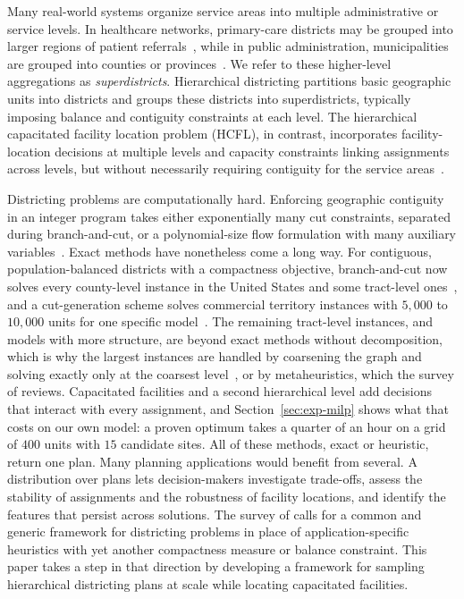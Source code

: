 \documentclass[preprint,12pt,authoryear]{elsarticle}
\theoremstyle{definition}
\begin{document}
Many real-world systems organize service areas into multiple administrative or service 
levels. In healthcare networks, primary-care districts may be grouped into larger 
regions of patient referrals~\citep{wang2025cluster}, while in public administration, 
municipalities are grouped into counties or provinces~\citep{bruno2017territorial}. 
We refer to these higher-level aggregations as \emph{superdistricts}. Hierarchical 
districting partitions basic geographic units into districts and groups these districts 
into superdistricts, typically imposing balance and contiguity constraints at each 
level. The hierarchical capacitated facility location problem (HCFL), in contrast, 
incorporates facility-location decisions at multiple levels and capacity constraints 
linking assignments across levels, but without necessarily requiring contiguity for the
service areas~\citep{contreras2020hierarchical}. 

Districting problems are computationally hard. Enforcing geographic contiguity in an integer program takes either exponentially many cut constraints, separated during branch-and-cut, or a polynomial-size flow formulation with many auxiliary variables~\citep{validi2022imposing}. Exact methods have nonetheless come a long way. For contiguous, population-balanced districts with a compactness objective, branch-and-cut now solves every county-level instance in the United States and some tract-level ones~\citep{validi2022cutedges, validi2022imposing}, and a cut-generation scheme solves commercial territory instances with $5{,}000$ to $10{,}000$ units for one specific model~\citep{rios2013commercial}. The remaining tract-level instances, and models with more structure, are beyond exact methods without decomposition, which is why the largest instances are handled by coarsening the graph and solving exactly only at the coarsest level~\citep{swamy2023multiobjective}, or by metaheuristics, which the survey of \citet{kalcsics2020districting} reviews. Capacitated facilities and a second hierarchical level add decisions that interact with every assignment, and Section~\ref{sec:exp-milp} shows what that costs on our own model: a proven optimum takes a quarter of an hour on a grid of $400$ units with $15$ candidate sites. All of these methods, exact or heuristic, return one plan. Many planning applications would benefit from several. A distribution over plans lets decision-makers investigate trade-offs, assess the stability of assignments and the robustness of facility locations, and identify the features that persist across solutions. The survey of \citet{kalcsics2020districting} calls for a common and generic framework for districting problems in place of application-specific heuristics with yet another compactness measure or balance constraint. This paper takes a step in that direction by developing a framework for sampling hierarchical districting plans at scale while locating capacitated facilities.
\end{document}

